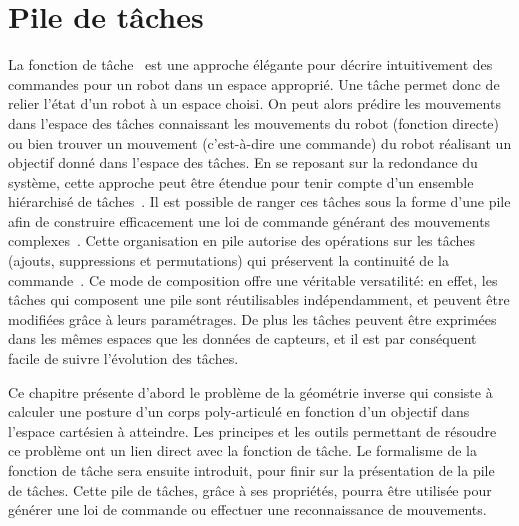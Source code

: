 \chapter{Pile de t\^aches}
\label{chap:sot}

La fonction de t\^ache~\cite{samson91} est une 
approche élégante pour décrire intuitivement des commandes pour un robot dans un espace
approprié. Une t\^ache permet donc de relier l'état d'un robot à un espace choisi. 
On peut alors prédire les mouvements dans l'espace des t\^aches connaissant
les mouvements du robot (fonction directe) ou bien trouver un mouvement (c'est-à-dire une commande)
du robot réalisant un objectif donné dans l'espace des t\^aches.
En se reposant sur la redondance du système, cette approche peut être étendue pour 
tenir compte d'un ensemble hiérarchisé de t\^aches~\cite{siciliano91}. 
Il est possible de ranger ces t\^aches sous la forme d'une pile
afin de construire efficacement une loi de commande générant des mouvements complexes~\cite{baerlocher04, mansard07}. 
Cette organisation en pile autorise des opérations sur les t\^aches (ajouts, suppressions et permutations)
qui préservent la continuité de la commande~\cite{keith09}.
Ce mode de composition offre une véritable versatilité: en effet,
les t\^aches qui composent une pile sont réutilisables indépendamment,
et peuvent être modifiées gr\^ace à leurs paramétrages. De plus
les t\^aches peuvent être exprimées dans les mêmes espaces que les données de
capteurs, et il est par conséquent facile de suivre l'évolution des t\^aches.

Ce chapitre présente d'abord le problème de la géométrie inverse
qui consiste à calculer une posture d'un corps poly-articulé en fonction
d'un objectif dans l'espace cartésien à atteindre. Les principes et les 
outils permettant de résoudre ce problème ont un lien direct avec la fonction de t\^ache.
Le formalisme de la fonction de t\^ache sera ensuite introduit, pour finir
sur la présentation de la pile de t\^aches. Cette pile de t\^aches, gr\^ace à 
ses propriétés, pourra \^etre utilisée pour générer une loi de commande
ou effectuer une reconnaissance de mouvements.

